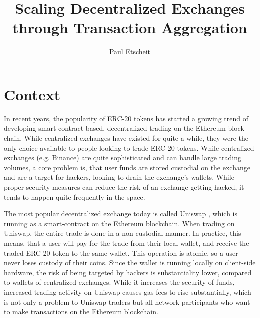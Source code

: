 \documentclass[runningheads]{llncs}
\begin{document}
%
\title{Scaling Decentralized Exchanges through Transaction Aggregation}
%
%
\author{Paul Etscheit}
%
%
%
\maketitle              %

\section{Context}
In recent years, the popularity of ERC-20 tokens has started a growing trend of developing smart-contract based, decentralized trading on the Ethereum block-chain. While centralized exchanges have existed for quite a while, they were the only choice available to people looking to trade ERC-20 tokens. While centralized exchanges (e.g. Binance) are quite sophisticated and can handle large trading volumes, a core problem is, that user funds are stored custodial on the exchange and are a target for hackers, looking to drain the exchange's wallets. While proper security measures can reduce the risk of an exchange getting hacked, it tends to happen quite frequently in the space. 

The most popular decentralized exchange today is called Uniswap \cite{adams2020uniswap}, which is running as a smart-contract on the Ethereum blockchain. When trading on Uniswap, the entire trade is done in a non-custodial manner. In practice, this means, that a user will pay for the trade from their local wallet, and receive the traded ERC-20 token to the same wallet. This operation is atomic, so a user never loses custody of their coins. Since the wallet is running locally on client-side hardware, the risk of being targeted by hackers is substantiality lower, compared to wallets of centralized exchanges. While it increases the security of funds, increased trading activity on Uniswap causes gas fees to rise substantially, which is not only a problem to Uniswap traders but all network participants who want to make transactions on the Ethereum blockchain.
\end{document}
